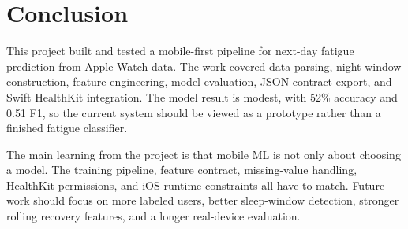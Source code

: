 \documentclass[sigconf,10pt]{acmart}
\begin{document}
\section{Conclusion}

This project built and tested a mobile-first pipeline for next-day fatigue prediction from Apple Watch data. The work covered data parsing, night-window construction, feature engineering, model evaluation, JSON contract export, and Swift HealthKit integration. The model result is modest, with 52\% accuracy and 0.51 F1, so the current system should be viewed as a prototype rather than a finished fatigue classifier.

The main learning from the project is that mobile ML is not only about choosing a model. The training pipeline, feature contract, missing-value handling, HealthKit permissions, and iOS runtime constraints all have to match. Future work should focus on more labeled users, better sleep-window detection, stronger rolling recovery features, and a longer real-device evaluation.



\end{document}
